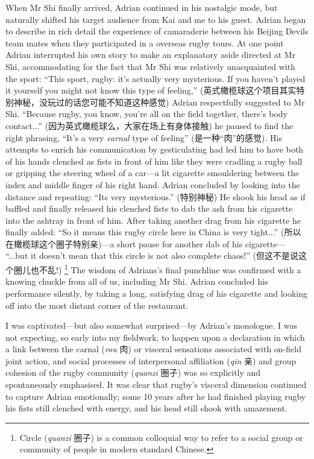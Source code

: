 \begin{CJK}{UTF8}{gbsn}
When Mr Shi finally arrived, Adrian continued in his nostalgic mode, but naturally shifted his target audience from Kai and me to his guest.  Adrian began to describe in rich detail the experience of camaraderie between his Beijing Devils team mates when they participated in a overseas rugby tours.  At one point Adrian interrupted his own story to make an explanatory aside directed at Mr Shi, accommodating for the fact that Mr Shi was relatively unacquainted with the sport: ``This sport, rugby: it's actually very mysterious. If you haven't played it yourself you might not know this type of feeling,'' (英式橄榄球这个项目其实特别神秘，没玩过的话您可能不知道这种感觉) Adrian respectfully suggested to Mr Shi.  ``Because rugby, you know, you're all on the field together, there's body contact...'' (因为英式橄榄球么，大家在场上有身体接触) he paused to find the right phrasing,  ``It's a very \textit{carnal} type of feeling'' (是一种``肉''的感觉).  His attempts to enrich his communication by gesticulating had led him to have both of his hands clenched as fists in front of him like they were cradling a rugby ball or gripping the steering wheel of a car---a lit cigarette smouldering between the index and middle finger of his right hand.  Adrian concluded by looking into the distance and repeating: ``Its very mysterious.'' (特别神秘) He shook his head as if baffled and finally released his clenched fists to dab the ash from his cigarette into the ashtray in front of him.  After taking another drag from his cigarette he finally added: ``So it means this rugby circle here in China is very tight...'' (所以在橄榄球这个圈子特别亲)---a short pause for another dab of his cigarette--- ``...but it doesn't mean that this circle is not also complete chaos!'' (但这不是说这个圈儿也不乱!)
  \footnote{Circle (\textit{quanzi} 圈子) is a common colloquial way to refer to a social group or community of people in modern standard Chinese.}
The wisdom of Adrians's final punchline was confirmed with a knowing chuckle from all of us, including Mr Shi. Adrian concluded his performance silently, by taking a long, satisfying drag of his cigarette and looking off into the most distant corner of the restaurant.

I was captivated---but also somewhat surprised---by Adrian's monologue.  I was not expecting, so early into my fieldwork, to happen upon a declaration in which a link between the carnal (\textit{rou} 肉) or visceral sensations associated with on-field joint action, and social processes of interpersonal affiliation (\textit{qin} 亲) and group cohesion of the rugby community (\textit{quanzi} 圈子) was so explicitly and spontaneously emphasised.  It was clear that rugby's visceral dimension continued to capture Adrian emotionally; some 10 years after he had finished playing rugby his fists still clenched with energy, and his head still shook with amazement.


\end{CJK}
